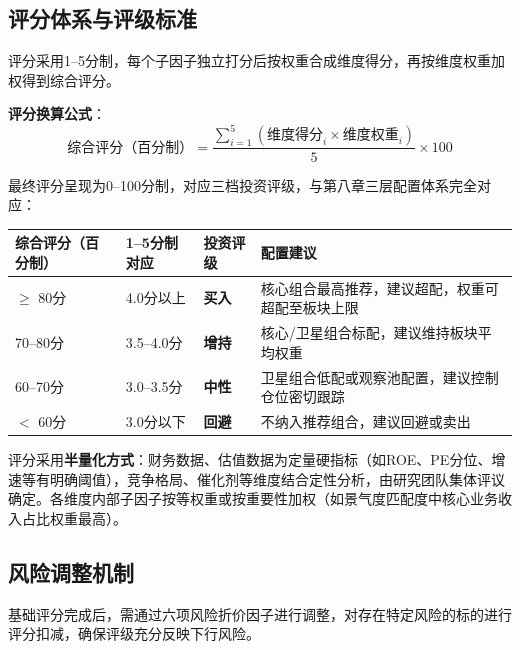 \subsection{评分体系与评级标准}

评分采用1--5分制，每个子因子独立打分后按权重合成维度得分，再按维度权重加权得到综合评分。

\vspace{0.2em}
\textbf{评分换算公式}：
$$\text{综合评分（百分制）} = \frac{\sum_{i=1}^{5} (\text{维度得分}_i \times \text{维度权重}_i)}{5} \times 100$$

最终评分呈现为0--100分制，对应三档投资评级，与第八章三层配置体系完全对应：

\begin{exhibitbox}[表8B-2：综合评分与投资评级对应表]
\centering
\small
\begin{tabularx}{\linewidth}{C{2.5cm} C{2.0cm} C{2.0cm} X}
\toprule
\textbf{综合评分（百分制）} & \textbf{1--5分制对应} & \textbf{投资评级} & \textbf{配置建议} \\
\midrule
{}
$\geq$ 80分 & 4.0分以上 & \textcolor{riskgreen}{\textbf{买入}} & 核心组合最高推荐，建议超配，权重可超配至板块上限 \\
\hline
{}
70--80分 & 3.5--4.0分 & \textcolor{accentblue}{\textbf{增持}} & 核心/卫星组合标配，建议维持板块平均权重 \\
\hline
{}
60--70分 & 3.0--3.5分 & \textcolor{riskamber}{\textbf{中性}} & 卫星组合低配或观察池配置，建议控制仓位密切跟踪 \\
\hline
{}
$<$ 60分 & 3.0分以下 & \textcolor{riskred}{\textbf{回避}} & 不纳入推荐组合，建议回避或卖出 \\
\bottomrule
\end{tabularx}
\end{exhibitbox}

评分采用\textbf{半量化方式}：财务数据、估值数据为定量硬指标（如ROE、PE分位、增速等有明确阈值），竞争格局、催化剂等维度结合定性分析，由研究团队集体评议确定。各维度内部子因子按等权重或按重要性加权（如景气度匹配度中核心业务收入占比权重最高）。

\subsection{风险调整机制}

基础评分完成后，需通过六项风险折价因子进行调整，对存在特定风险的标的进行评分扣减，确保评级充分反映下行风险。

